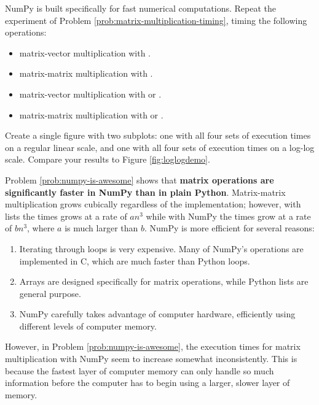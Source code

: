 \begin{problem} %
NumPy is built specifically for fast numerical computations.
Repeat the experiment of Problem \ref{prob:matrix-multiplication-timing}, timing the following operations:
%
\begin{itemize}
\item matrix-vector multiplication with .
\item matrix-matrix multiplication with .
\item matrix-vector multiplication with  or .
\item matrix-matrix multiplication with  or .
\end{itemize}

Create a single figure with two subplots: one with all four sets of execution times on a regular linear scale, and one with all four sets of execution times on a log-log scale.
Compare your results to Figure \ref{fig:loglogdemo}.
\label{prob:numpy-is-awesome}
\end{problem}

\begin{info} %
Problem \ref{prob:numpy-is-awesome} shows that \textbf{matrix  operations are significantly faster in NumPy than in plain Python}.
Matrix-matrix multiplication grows cubically regardless of the implementation; however, with lists the times grows at a rate of $an^3$ while with NumPy the times grow at a rate of $bn^3$, where $a$ is much larger than $b$.
NumPy is more efficient for several reasons:
\begin{enumerate}
    \item Iterating through loops is very expensive.
    Many of NumPy's operations are implemented in C, which are much faster than Python loops.
    \item Arrays are designed specifically for matrix operations, while Python lists are general purpose.
    \item NumPy carefully takes advantage of computer hardware, efficiently using different levels of computer memory.
\end{enumerate}

However, in Problem \ref{prob:numpy-is-awesome}, the execution times for matrix multiplication with NumPy seem to increase somewhat inconsistently.
This is because the fastest layer of computer memory can only handle so much information before the computer has to begin using a larger, slower layer of memory.

\begin{comment} %
Below, we plot execution times for vector-vector addition with NumPy.
The large spikes in the plot indicate the times that the array no longer fits in the current level of memory.

\begin{figure}[H]
\texttt{[image: figures/cachingDemo.pdf]}
\end{figure}
\end{comment}

\end{info}

